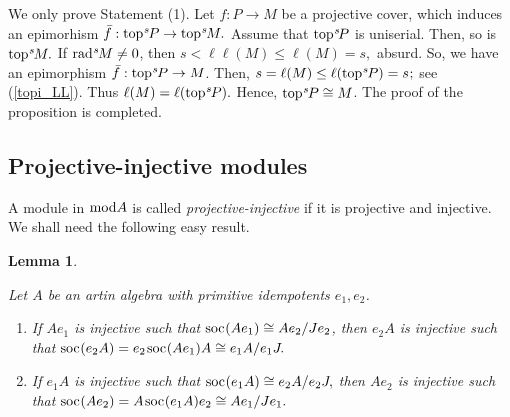 \documentclass[10pt]{amsart}
\newtheorem{Lemma}[Theo]{Lemma}
\theoremstyle{definition}
\newcommand{\mmod}{{\rm mod}}
\newcommand{\rad}{{\rm rad}\hspace{.5pt}}
\newcommand{\soc}{{\rm soc}\hspace{.5pt}}
\newcommand{\ntop}{{\rm top}\hspace{.5pt}}
\newcommand{\hp}{\hspace{.5pt}}
\newcommand{\vp}{\vspace{.5pt}}
\begin{document}
\vspace{-1.5pt}

 We only prove Statement (1). Let $f: P\to M$ be a projective cover, which induces an epimorhism $\bar{f}: \ntop^s\hspace{-1pt}P\to \ntop^s\hspace{-1pt}M.$ 
Assume that $\ntop^s\hspace{-1.5pt}P$ is uniserial. Then, so is $\ntop^s\hspace{-1pt}M.$ If $\rad^s\hspace{-1pt}M\ne 0$, then $s<\ell\ell(M)\le \ell(M)=s,$ absurd. So, we have an epimorphism $\bar{f}: \ntop^s\hspace{-1pt}P\to M$. Then, $s=\ell(M)\le \ell(\ntop^s\hspace{-1pt}P)=s\hp ;$ see (\ref{topi_LL}). Thus $\ell(M)=\ell(\ntop^s\hspace{-1pt}P).$ Hence, $\ntop^s\hspace{-1pt}P\cong M$. 
%
The proof of the proposition is completed.

\subsection{\sc Projective-injective modules} A module in $\mmod A$ is called {\it projective-injective} if it is projective and injective. We shall need the following easy result.

\begin{Lemma}\label{pi_corresp}

Let $A$ be an artin algebra with primitive idempotents $e_1, e_2$. 

\begin{enumerate}[$(1)$]

\vspace{-2.2pt}

\item If $Ae_1$ is injective such that $\soc(Ae_1)\cong Ae_2/Je_2$, then
$e_2A$ is injective such that $\soc(e_2A)=e_2 \hspace{1pt}\soc(Ae_1) A\cong e_1A/e_1J.$


\item If $e_1A$ is injective such that $\soc(e_1A)\cong e_2A/e_2J,$ then $Ae_2$ is injective such that $\soc(Ae_2)=A \hspace{1pt} \soc(e_1A) e_2 \cong Ae_1/Je_1.$

\end{enumerate}\end{Lemma}
\end{document}

